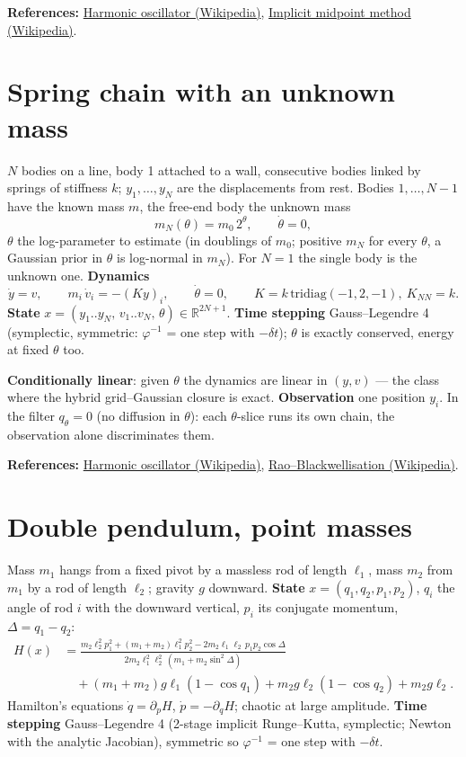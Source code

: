 \documentclass[11pt,a4paper]{article}
\newcommand{\modelsection}[2]{\clearpage\hypertarget{#1}{}\section{#2}\label{model:#1}}
\begin{document}
\textbf{References:} \href{https://en.wikipedia.org/wiki/Harmonic_oscillator}{Harmonic oscillator (Wikipedia)}, \href{https://en.wikipedia.org/wiki/Midpoint_method}{Implicit midpoint method (Wikipedia)}.

\modelsection{spring_mass}{Spring chain with an unknown mass}
$N$ bodies on a line, body 1 attached to a wall, consecutive bodies linked by springs of stiffness $k$; $y_1,\dots,y_N$ are the displacements from rest. Bodies $1,\dots,N-1$ have the known mass $m$, the free-end body the unknown mass
\[
  m_N(\theta)=m_0\,2^{\theta}, \qquad \dot\theta=0,
\]
$\theta$ the log-parameter to estimate (in doublings of $m_0$; positive $m_N$ for every $\theta$, a Gaussian prior in $\theta$ is log-normal in $m_N$). For $N=1$ the single body is the unknown one. \textbf{Dynamics}
\[
  \dot y=v, \qquad m_i\,\dot v_i=-(K y)_i, \qquad \dot\theta=0, \qquad K=k\,\mathrm{tridiag}(-1,2,-1),\ K_{NN}=k .
\]
\textbf{State} $x=(y_1..y_N,\,v_1..v_N,\,\theta)\in\mathbb R^{2N+1}$. \textbf{Time stepping} Gauss--Legendre 4 (symplectic, symmetric: $\varphi^{-1}$ = one step with $-\delta t$); $\theta$ is exactly conserved, energy at fixed $\theta$ too.

\textbf{Conditionally linear}: given $\theta$ the dynamics are linear in $(y,v)$ — the class where the hybrid grid--Gaussian closure is exact. \textbf{Observation} one position $y_i$. In the filter $q_\theta=0$ (no diffusion in $\theta$): each $\theta$-slice runs its own chain, the observation alone discriminates them.

\textbf{References:} \href{https://en.wikipedia.org/wiki/Harmonic_oscillator}{Harmonic oscillator (Wikipedia)}, \href{https://en.wikipedia.org/wiki/Rao\%E2\%80\%93Blackwell_theorem}{Rao--Blackwellisation (Wikipedia)}.

\modelsection{pendulum}{Double pendulum, point masses}
Mass $m_1$ hangs from a fixed pivot by a massless rod of length $\ell_1$, mass $m_2$ from $m_1$ by a rod of length $\ell_2$; gravity $g$ downward. \textbf{State} $x=(q_1,q_2,p_1,p_2)$, $q_i$ the angle of rod $i$ with the downward vertical, $p_i$ its conjugate momentum, $\Delta=q_1-q_2$:
\begin{align*}
  H(x)&=\frac{m_2\ell_2^2p_1^2+(m_1+m_2)\ell_1^2p_2^2-2m_2\ell_1\ell_2\,p_1p_2\cos\Delta}{2m_2\ell_1^2\ell_2^2\,(m_1+m_2\sin^2\Delta)} \\
      &\quad+(m_1+m_2)g\ell_1(1-\cos q_1)+m_2g\ell_2(1-\cos q_2)+m_2g\ell_2 .
\end{align*}
Hamilton's equations $\dot q=\partial_pH$, $\dot p=-\partial_qH$; chaotic at large amplitude. \textbf{Time stepping} Gauss--Legendre 4 (2-stage implicit Runge--Kutta, symplectic; Newton with the analytic Jacobian), symmetric so $\varphi^{-1}$ = one step with $-\delta t$.
\end{document}
